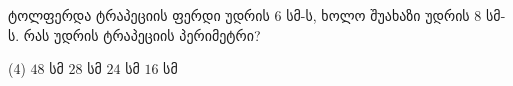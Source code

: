 ტოლფერდა ტრაპეციის ფერდი უდრის \(6\) სმ-ს, ხოლო შუახაზი უდრის \(8\) სმ-ს. რას უდრის ტრაპეციის პერიმეტრი?

\vspace*{0.5cm}

\begin{tasks} (4)
    \task[ა)] \( 48 \) სმ 
    \task[ბ)] \( 28 \) სმ
    \task[გ)] \( 24 \) სმ
    \task[დ)] \( 16 \) სმ
\end{tasks}